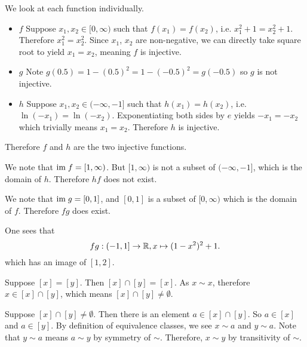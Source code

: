 \begin{questions}
    \item \begin{partquestions}{\alph*}
        \item We look at each function individually.
        \begin{itemize}
            \item $\boxed{f}$ Suppose $x_1,x_2 \in [0,\infty)$ such that $f(x_1) = f(x_2)$, i.e. $x_1^2 + 1 = x_2^2 + 1$. Therefore $x_1^2 = x_2^2$. Since $x_1$, $x_2$ are non-negative, we can directly take square root to yield $x_1 = x_2$, meaning $f$ is injective.
            \item $\boxed{g}$ Note $g(0.5) = 1-(0.5)^2 = 1 - (-0.5)^2 = g(-0.5)$ so $g$ is not injective.
            \item $\boxed{h}$ Suppose $x_1,x_2 \in (-\infty, -1]$ such that $h(x_1) = h(x_2)$, i.e. $\ln(-x_1) = \ln(-x_2)$. Exponentiating both sides by $e$ yields $-x_1 = -x_2$ which trivially means $x_1 = x_2$. Therefore $h$ is injective.
        \end{itemize}
        Therefore $f$ and $h$ are the two injective functions.

        \item We note that $\mathrm{im}\; f = [1, \infty)$. But $[1, \infty)$ is not a subset of $(-\infty, -1]$, which is the domain of $h$. Therefore $hf$ does not exist.

        \item We note that $\mathrm{im}\; g = [0, 1]$, and $[0, 1]$ is a subset of $[0, \infty)$ which is the domain of $f$. Therefore $fg$ does exist.

        One sees that
        \[
            fg: (-1, 1] \to \mathbb{R}, x \mapsto (1-x^2)^2 + 1.
        \]
        which has an image of $[1, 2]$.
    \end{partquestions}

    \item \begin{partquestions}{\alph*}
        \item Suppose $[x] = [y]$. Then $[x] \cap [y] = [x]$. As $x \sim x$, therefore $x \in [x] \cap [y]$, which means $[x] \cap [y] \neq \emptyset$.

        \item Suppose $[x] \cap [y] \neq \emptyset$. Then there is an element $a \in [x] \cap [y]$. So $a \in [x]$ and $a \in [y]$. By definition of equivalence classes, we see $x \mathrel{\sim} a$ and $y \mathrel{\sim} a$. Note that $y \mathrel{\sim} a$ means $a \mathrel{\sim} y$ by symmetry of $\sim$. Therefore, $x \mathrel{\sim} y$ by transitivity of $\sim$.


\end{partquestions}
\end{questions}
